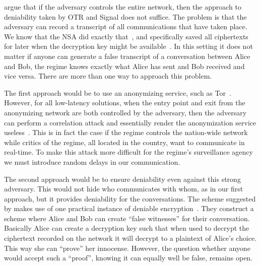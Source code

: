 \citet{OTPKX} argue that if the adversary controls the entire network, then the
approach to deniability taken by \ac{OTR} and Signal does not suffice.
The problem is that the adversary can record a transcript of all communications
that have taken place.
We know that the \ac{NSA} did exactly that~\cite{XKeyscore}, and specifically 
saved all ciphertexts for later when the decryption key might be 
available~\cite{NSAsavesCiphertexts}.
In this setting it does not matter if anyone can generate a false transcript of
a conversation between Alice and Bob, the regime knows exactly what Alice has 
sent and Bob received and vice versa.
There are more than one way to approach this problem.

The first approach would be to use an anonymizing service, such as 
Tor~\cite{Tor}.
However, for all low-latency solutions, when the entry point and exit from the 
anonymizing network are both controlled by the adversary, then the adversary 
can perform a correlation attack and essentially render the anonymization 
service useless~\cite{AnonymousCommunicationSystems}.
This is in fact the case if the regime controls the nation-wide network while 
critics of the regime, all located in the country, want to communicate in 
real-time.
To make this attack more difficult for the regime's surveillance agency we must 
introduce random delays in our communication.

The second approach would be to ensure deniability even against this strong 
adversary.
This would not hide who communicates with whom, as in our first approach, but 
it provides deniability for the conversations.
The scheme suggested by \citet{OTPKX} makes use of one practical instance of 
deniable encryption~\cite{DeniableEncryption}.
They construct a scheme where Alice and Bob can create \enquote{false 
witnesses} for their conversation.
Basically Alice can create a decryption key such that when used to decrypt the 
ciphertext recorded on the network it will decrypt to a plaintext of Alice's 
choice.
This way she can \enquote{prove} her innocense.
However, the question whether anyone would accept such a \enquote{proof}, 
knowing it can equally well be false, remains open.
